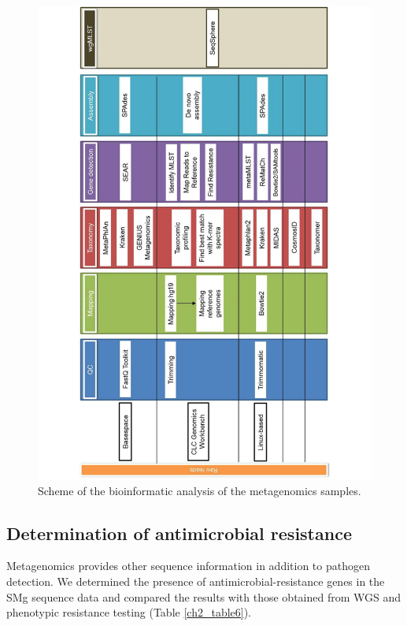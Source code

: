 \begin{figure}[h!]
\centering
\includegraphics[width=\textwidth]{figures/chapter 2/41598_2018_31873_Fig1_HTML.pdf}
\caption{Scheme of the bioinformatic analysis of the metagenomics samples.}
\label{fig:chap2_figure1}
\end{figure}

\subsection{Determination of antimicrobial resistance}

Metagenomics provides other sequence information in addition to pathogen detection. 
We determined the presence of antimicrobial-resistance genes in the SMg sequence data and compared the results with those obtained from WGS and phenotypic resistance testing (Table \ref{ch2_table6}).

